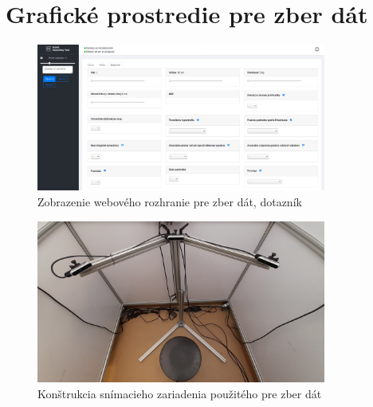 \newpage
\section{Grafické prostredie pre zber dát} \label{sec:Priloha:HMI_WEB}

\begin{figure}[H]
	\centering
	\includegraphics[width=0.85\textwidth]{figures/hmi_web3.png}
	\caption{Zobrazenie webového rozhranie pre zber dát, dotazník}
	\label{fig:hmi_web:c}
\end{figure}

\begin{figure}[H]
	\centering
	\includegraphics[width=0.85\textwidth]{figures/clinic_scaning.png}
	\caption{Konštrukcia snímacieho zariadenia použitého pre zber dát}
	\label{fig:hmi_web:d}
\end{figure}
